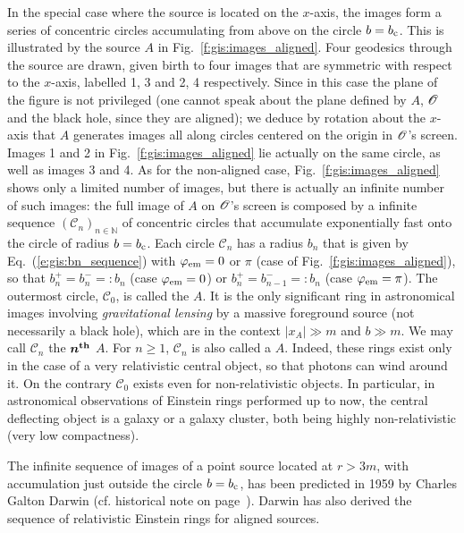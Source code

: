In the special case where the source is located on the $x$-axis, the images form
a series of concentric circles accumulating from above on the circle
$b = b_{\rm c}$. This is illustrated by the source $A$ in
Fig.~\ref{f:gis:images_aligned}. Four geodesics through the source are drawn,
given birth to four images that
are symmetric with respect to the $x$-axis, labelled 1, 3 and 2, 4 respectively.
Since in this case the plane of the figure is not privileged (one cannot speak
about the plane defined by $A$, $\mathscr{O}$ and the black hole, since they are aligned);
we deduce by rotation about the $x$-axis that $A$ generates images all along
circles centered on the origin in $\mathscr{O}$'s screen. Images 1 and 2 in Fig.~\ref{f:gis:images_aligned}
lie actually on the same circle, as well as images 3 and 4.
As for the non-aligned case, Fig.~\ref{f:gis:images_aligned} shows only a limited number of
images, but there is actually an infinite number of such images: the full image
of $A$ on $\mathscr{O}$'s screen is composed by a infinite sequence $(\mathscr{C}_n)_{n\in\mathbb{N}}$
of concentric circles
that accumulate exponentially fast onto the circle of radius $b = b_{\rm c}$.
Each circle $\mathscr{C}_n$ has a radius $b_n$ that is given
by Eq.~(\ref{e:gis:bn_sequence}) with $\varphi_{\rm em} = 0$ or $\pi$ (case of
Fig.~\ref{f:gis:images_aligned}), so that $b_n^+ = b_n^- =: b_n$ (case $\varphi_{\rm em} = 0$)
or $b_n^+ = b_{n-1}^- =: b_n$ (case $\varphi_{\rm em} = \pi$).
The outermost circle, $\mathscr{C}_0$, is called the
 $A$.
It is the only significant ring in astronomical images involving \emph{gravitational
lensing} by a massive foreground source (not necessarily
a black hole), which are in the context $|x_A|\gg m$ and $b\gg m$.
We may call $\mathscr{C}_n$ the $\bm{n^{\rm th}}$ $A$.
For $n\geq 1$, $\mathscr{C}_n$ is also called a 
$A$. Indeed, these rings exist only in the case of a very relativistic central object, so that
photons can wind around it. On the contrary $\mathscr{C}_0$ exists even for non-relativistic
objects. In particular, in astronomical observations of Einstein rings performed up
to now, the central deflecting object is a galaxy or a galaxy cluster,
both being highly non-relativistic (very low compactness).

\begin{hist} \label{h:gis:seq_images_Darwin}
The infinite sequence of images of a point source located at $r>3m$, with accumulation just outside the circle $b=b_{\rm c}$, has been predicted in 1959 by
Charles Galton Darwin \cite{Darwi59}
(cf. historical note on page~\pageref{h:gis:Darwin_formula}). Darwin has
also derived the sequence of relativistic Einstein rings for aligned sources.
\end{hist}


